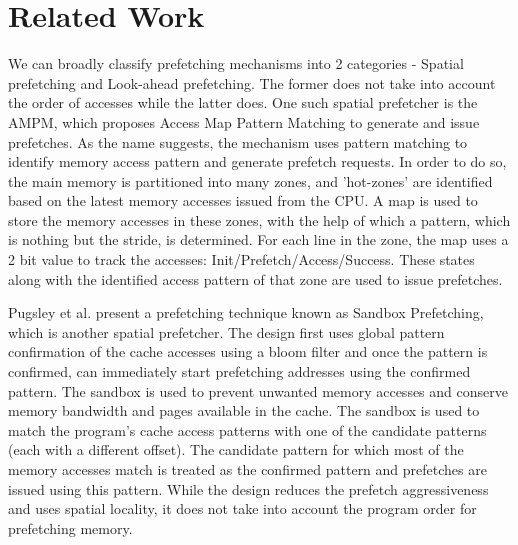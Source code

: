 \documentclass[conference]{IEEEtran}
\begin{document}
\section{Related Work}

We can broadly classify prefetching mechanisms into 2 categories - Spatial prefetching and Look-ahead prefetching. The former does not take into account the order of accesses while the latter does. One such spatial prefetcher is the AMPM\cite{AMPM}, which proposes Access Map Pattern Matching to generate and issue prefetches. As the name suggests, the mechanism uses pattern matching to identify memory access pattern and generate prefetch requests. In order to do so, the main memory is partitioned into many zones, and 'hot-zones' are identified based on the latest memory accesses issued from the CPU. A map is used to store the memory accesses in these zones, with the help of which a pattern, which is nothing but the stride, is determined. For each line in the zone, the map uses a 2 bit value to track the accesses: Init/Prefetch/Access/Success. These states along with the identified access pattern of that zone are used to issue prefetches.  

Pugsley et al. present a prefetching technique known as Sandbox Prefetching\cite{sandbox}, which is another spatial prefetcher. The design first uses global pattern confirmation of the cache accesses using a bloom filter and once the pattern is confirmed, can immediately start prefetching addresses using the confirmed pattern. The sandbox is used to prevent unwanted memory accesses and conserve memory bandwidth and pages available in the cache. The sandbox is used to match the program’s cache access patterns with one of the candidate patterns (each with a different offset). The candidate pattern for which most of the memory accesses match is treated as the confirmed pattern and prefetches are issued using this pattern. While the design reduces the prefetch aggressiveness and uses spatial locality, it does not take into account the program order for prefetching memory.
\end{document}
